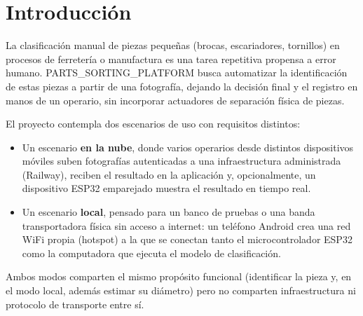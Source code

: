 \section{Introducción}
\label{sec:introduccion}

La clasificación manual de piezas pequeñas (brocas, escariadores,
tornillos) en procesos de ferretería o manufactura es una tarea
repetitiva propensa a error humano. PARTS\_SORTING\_PLATFORM busca
automatizar la identificación de estas piezas a partir de una
fotografía, dejando la decisión final y el registro en manos de un
operario, sin incorporar actuadores de separación física de piezas.

El proyecto contempla dos escenarios de uso con requisitos distintos:

\begin{itemize}
  \item Un escenario \textbf{en la nube}, donde varios operarios desde
  distintos dispositivos móviles suben fotografías autenticadas a una
  infraestructura administrada (Railway), reciben el resultado en la
  aplicación y, opcionalmente, un dispositivo ESP32 emparejado muestra
  el resultado en tiempo real.

  \item Un escenario \textbf{local}, pensado para un banco de pruebas o
  una banda transportadora física sin acceso a internet: un teléfono
  Android crea una red WiFi propia (hotspot) a la que se conectan tanto
  el microcontrolador ESP32 como la computadora que ejecuta el modelo
  de clasificación.
\end{itemize}

Ambos modos comparten el mismo propósito funcional (identificar la
pieza y, en el modo local, además estimar su diámetro) pero no
comparten infraestructura ni protocolo de transporte entre sí.
